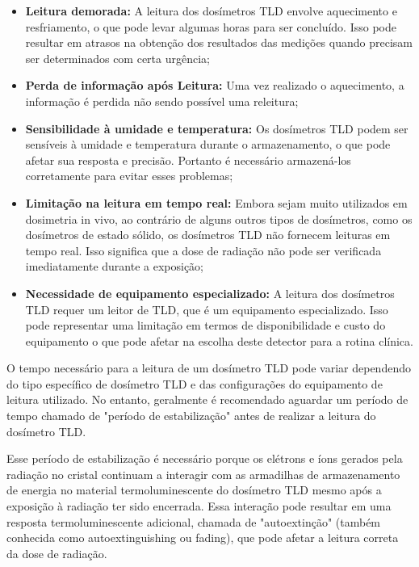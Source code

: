 \documentclass[11pt,a4paper]{article}
\begin{document}
		\begin{itemize}[label=\textcolor{CarnationPink}{$\blacktriangleright$}]
			\item \textbf{Leitura demorada: } A leitura dos dosímetros TLD envolve aquecimento e resfriamento, o que pode levar algumas horas para ser concluído. Isso pode resultar em atrasos na obtenção dos resultados das medições quando precisam ser determinados com certa urgência;
			\item \textbf{Perda de informação após Leitura: } Uma vez realizado o aquecimento, a informação é perdida não sendo possível uma releitura;
			\item \textbf{Sensibilidade à umidade e temperatura:} Os dosímetros TLD podem ser sensíveis à umidade e temperatura durante o armazenamento, o que pode afetar sua resposta e precisão. Portanto é necessário armazená-los corretamente para evitar esses problemas;
			\item \textbf{Limitação na leitura em tempo real:} Embora sejam muito utilizados em dosimetria in vivo, ao contrário de alguns outros tipos de dosímetros, como os dosímetros de estado sólido, os dosímetros TLD não fornecem leituras em tempo real. Isso significa que a dose de radiação não pode ser verificada imediatamente durante a exposição;
			\item \textbf{Necessidade de equipamento especializado:} A leitura dos dosímetros TLD requer um leitor de TLD, que é um equipamento especializado. Isso pode representar uma limitação em termos de disponibilidade e custo do equipamento o que pode afetar na escolha deste detector para a rotina clínica.
		\end{itemize}

		O tempo necessário para a leitura de um dosímetro TLD pode variar dependendo do tipo específico de dosímetro TLD e das configurações do equipamento de leitura utilizado. No entanto, geralmente é recomendado aguardar um período de tempo chamado de "período de estabilização" antes de realizar a leitura do dosímetro TLD.

		Esse período de estabilização é necessário porque os elétrons e íons gerados pela radiação no cristal continuam a interagir com as armadilhas de armazenamento de energia no material termoluminescente do dosímetro TLD mesmo após a exposição à radiação ter sido encerrada. Essa interação pode resultar em uma resposta termoluminescente adicional, chamada de "autoextinção" (também conhecida como autoextinguishing ou fading), que pode afetar a leitura correta da dose de radiação. 
\end{document}

